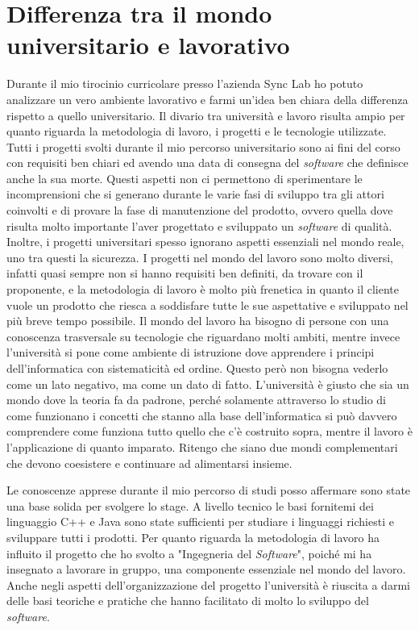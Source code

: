 
\section{Differenza tra il mondo universitario e lavorativo}
Durante il mio tirocinio curricolare presso l'azienda Sync Lab ho potuto analizzare un vero ambiente lavorativo e farmi un'idea ben chiara della differenza rispetto a quello universitario. Il divario tra università e lavoro risulta ampio per quanto riguarda la metodologia di lavoro, i progetti e le tecnologie utilizzate. Tutti i progetti svolti durante il mio percorso universitario sono ai fini del corso con requisiti ben chiari ed avendo una data di consegna del \textit{software} che definisce anche la sua morte. Questi aspetti non ci permettono di sperimentare le incomprensioni che si generano durante le varie fasi di sviluppo tra gli attori coinvolti e di provare la fase di manutenzione del prodotto, ovvero quella dove risulta molto importante l'aver progettato e sviluppato un \textit{software} di qualità. Inoltre, i progetti universitari spesso ignorano aspetti essenziali nel mondo reale, uno tra questi la sicurezza.
I progetti nel mondo del lavoro sono molto diversi, infatti quasi sempre non si hanno requisiti ben definiti, da trovare con il proponente, e la metodologia di lavoro è molto più frenetica in quanto il cliente vuole un prodotto che riesca a soddisfare tutte le sue aspettative e sviluppato nel più breve tempo possibile. 
Il mondo del lavoro ha bisogno di persone con una conoscenza trasversale su tecnologie che riguardano molti ambiti, mentre invece l'università si pone come ambiente di istruzione dove apprendere i principi dell'informatica con sistematicità ed ordine. 
Questo però non bisogna vederlo come un lato negativo, ma come un dato di fatto. L'università è giusto che sia un mondo dove la teoria fa da padrone, perché solamente attraverso lo studio di come funzionano i concetti che stanno alla base dell'informatica si può davvero comprendere come funziona tutto quello che c'è costruito sopra, mentre il lavoro è l'applicazione di quanto imparato. Ritengo che siano due mondi complementari che devono coesistere e continuare ad alimentarsi insieme.

Le conoscenze apprese durante il mio percorso di studi posso affermare sono state una base solida per svolgere lo stage. A livello tecnico le basi fornitemi dei linguaggio C++ e Java sono state sufficienti per studiare i linguaggi richiesti e sviluppare tutti i prodotti. Per quanto riguarda la metodologia di lavoro ha influito il progetto che ho svolto a "Ingegneria del \textit{Software}", poiché mi ha insegnato a lavorare in gruppo, una componente essenziale nel mondo del lavoro. Anche negli aspetti dell'organizzazione del progetto l'università è riuscita a darmi delle basi teoriche e pratiche che hanno facilitato di molto lo sviluppo del \textit{software}.

